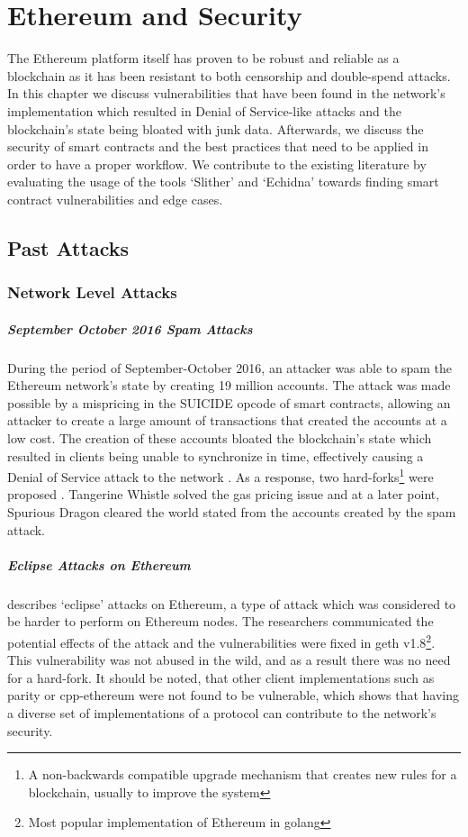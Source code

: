 \chapter{Ethereum and Security}

The Ethereum platform itself has proven to be robust and reliable as a blockchain as it has been resistant to both censorship and double-spend attacks. In this chapter we discuss vulnerabilities that have been found in the network's implementation which resulted in Denial of Service-like attacks and the blockchain's state being bloated with junk data. Afterwards, we discuss the security of smart contracts and the best practices that need to be applied in order to have a proper workflow. We contribute to the existing literature by evaluating the usage of the tools `Slither' and `Echidna' towards finding smart contract vulnerabilities and edge cases.

\section{Past Attacks}
\subsection{Network Level Attacks}

\paragraph{September October 2016 Spam Attacks}
During the period of September-October 2016, an attacker was able to spam the Ethereum network's state by creating 19 million accounts. The attack was made possible by a mispricing in the SUICIDE opcode of smart contracts, allowing an attacker to create a large amount of transactions that created the accounts at a low cost. The creation of these accounts bloated the blockchain's state which resulted in clients being unable to synchronize in time, effectively causing a Denial of Service attack to the network \cite{eip150faq}. As a response, two hard-forks\footnote{A non-backwards compatible upgrade mechanism that creates new rules for a blockchain, usually to improve the system} were proposed \cite{eip607, eip608}. Tangerine Whistle solved the gas pricing issue and at a later point, Spurious Dragon cleared the world stated from the accounts created by the spam attack. 

\paragraph{Eclipse Attacks on Ethereum}
\cite{cryptoeprint:2018:236} describes `eclipse' attacks on Ethereum, a type of attack which was considered to be harder to perform on Ethereum nodes. The researchers communicated the potential effects of the attack and the vulnerabilities were fixed in geth v1.8\footnote{Most popular implementation of Ethereum in golang}. This vulnerability was not abused in the wild, and as a result there was no need for a hard-fork. It should be noted, that other client implementations such as parity or cpp-ethereum were not found to be vulnerable, which shows that having a diverse set of implementations of a protocol can contribute to the network's security.

